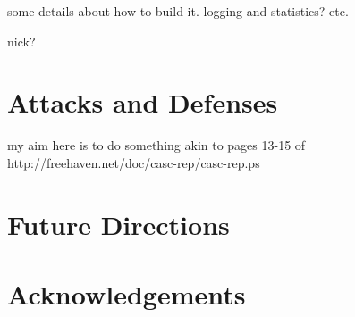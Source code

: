 \documentclass{llncs}
\begin{document}
some details about how to build it. logging and statistics? etc.

nick?


\section{Attacks and Defenses}
\label{sec:attacks}

my aim here is to do something akin to pages 13-15 of
http://freehaven.net/doc/casc-rep/casc-rep.ps


\section{Future Directions}
\label{sec:conclusion}


\section*{Acknowledgements}


 
\end{document}
